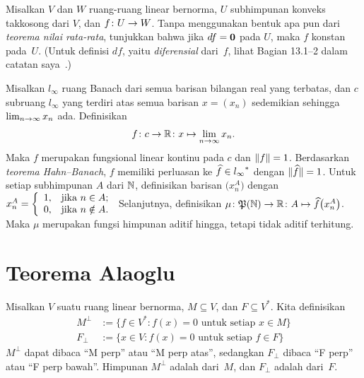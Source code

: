 \begin{exer} Misalkan $V$ dan $W$ ruang-ruang linear bernorma, $U$ subhimpunan konveks takkosong dari $V$,
dan $f \colon U \rightarrow W$.  Tanpa menggunakan bentuk apa pun dari \emph{teorema nilai rata-rata}, tunjukkan
bahwa jika $df = \mathbf{0}$ pada $U$, maka $f$ konstan pada~$U$.  (Untuk definisi $df$, yaitu
\emph{diferensial} dari~$f$, lihat Bagian 13.1--2 dalam catatan saya~\cite{Erdman:2007}.)
\end{exer}

\begin{exam}\label{C067181} Misalkan $l_\infty$ ruang Banach dari semua barisan bilangan
real yang terbatas, dan $c$ subruang $l_\infty$ yang terdiri atas semua barisan $x = (x_n)$
sedemikian sehingga $\lim_{n \rightarrow \infty} x_n$ ada. Definisikan
  \[ f\colon c \rightarrow \mathbb{R}\colon x \mapsto \lim_{n\rightarrow \infty} x_n. \]
Maka $f$ merupakan fungsional linear kontinu pada $c$ dan $\lVert f\rVert = 1$.  Berdasarkan
\emph{teorema Hahn--Banach}, $f$ memiliki perluasan ke $\widehat{f} \in {l_\infty}^*$ dengan
$\lVert\widehat{f}\rVert = 1$. Untuk setiap
subhimpunan $A$ dari $\mathbb{N}$, definisikan barisan $\bigl(x^A_n\bigr)$ dengan $x^A_n = \left\{%
\begin{array}{ll}
    1, & \hbox{jika $n \in A$;} \\
    0, & \hbox{jika $n \notin A$.} \\
\end{array}%
\right.$ Selanjutnya, definisikan $ \mu\colon \mathfrak{P}(\mathbb{N}) \rightarrow \mathbb{R} \colon A \mapsto \widehat{f}\bigl(x^A_n\bigr)$. Maka $\mu$ merupakan fungsi himpunan aditif hingga, tetapi tidak aditif
terhitung.
\end{exam}













\section{Teorema Alaoglu}
\begin{notn} Misalkan $V$ suatu ruang linear bernorma, $M \subseteq V$, dan $F \subseteq V^\ast$.
Kita definisikan
 \begin{align*}
         M^\perp &:= \{f \in V^*\colon f(x)=0 \text{ untuk setiap $x \in M$}\} \\
         F_\perp &:= \{x \in V\colon f(x)=0 \text{ untuk setiap $f \in F$}\}
  \end{align*}
$M^\perp$ dapat dibaca ``M perp'' atau ``M perp atas'', sedangkan $F_\perp$ dibaca ``F perp'' atau ``F perp bawah''.
Himpunan $M^\perp$ adalah
 dari~$M$, dan $F_\perp$ adalah
 dari~$F$.
\end{notn}

